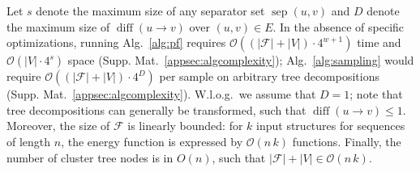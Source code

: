 \documentclass{bmcart}
\newcommand{\val}{\bar S} %
\newcommand{\separator}[2]{\operatorname{sep}(#1,#2)}
\newcommand{\difference}[2]{\operatorname{diff}(#1 \rightarrow #2)}
\newcommand{\Message}[2]{m_{#1\rightarrow #2}}
\newcommand{\partseqs}{\mathcal{P\!S}}
\newcommand{\F}{\mathcal{F}}
\newcommand{\substitute}[2]{#1\!\oplus\!#2}
\newcommand{\evalfor}[2]{#1(#2)}
\renewcommand{\gets}{:=}
\begin{document}
Let $s$ denote the maximum size of any separator set $\separator{u}{v}$ and $D$ denote the maximum size of
$\difference{u}{v}$ over $(u,v)\in E$.  In the absence
of specific optimizations, running Alg.~\ref{alg:pf} requires
$\mathcal{O}((|\F|+|V|)\cdot 4^{w+1})$ time and
$\mathcal{O}(|V|\cdot4^s)$ space
(Supp. Mat.~\ref{appsec:algcomplexity}); Alg.~\ref{alg:sampling} would
require $\mathcal{O}((|\F|+|V|)\cdot 4^D)$ per sample on arbitrary
tree decompositions
(Supp. Mat.~\ref{appsec:algcomplexity}). W.l.o.g.\ we assume that
$D=1$; note that tree decompositions can generally be transformed,
such that $\difference{u}{v}\leq 1$.
%
Moreover, the size of $\F$ is linearly bounded: for $k$
input structures for sequences of length $n$, the energy function is
expressed by $\mathcal{O}(n\,k)$ functions. Finally, the number of cluster
tree nodes is in $O(n)$, such that $|\F|+|V| \in \mathcal{O}(n\,k)$.


\end{document}
